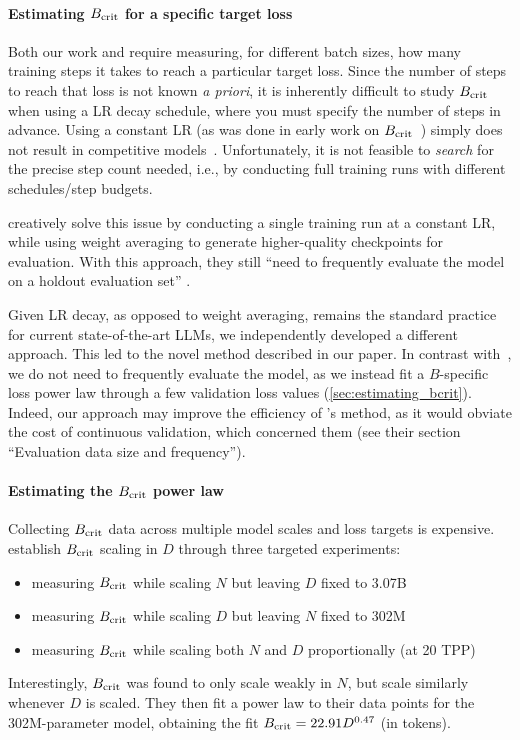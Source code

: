 \paragraph{Estimating $B_{\text{crit}}$ for a specific target loss}

Both our work and \citet{zhang2024how} require measuring, for
different batch sizes, how many training steps it takes to reach a
particular target loss.
%
Since the number of steps to reach that loss is not known \emph{a
priori}, it is inherently difficult to study $B_{\text{crit}}$ when using a LR
decay schedule, where you must specify the number of steps in advance.
Using a constant LR (as was done in early work on
$B_{\text{crit}}$~\citep{mccandlish2018empirical}) simply does not result in
competitive models~\citep{bergsma2025straight}.
%
Unfortunately, it is not feasible to \emph{search} for the precise
step count needed, i.e., by conducting full training runs with
different schedules/step budgets.

\citet{zhang2024how} creatively solve this issue by conducting a
single training run at a constant LR, while using weight averaging to
generate higher-quality checkpoints for evaluation.  With this
approach, they still ``need to frequently evaluate the model on a
holdout evaluation set'' \citep{zhang2024how}.

Given LR decay, as opposed to weight averaging, remains the standard
practice for current state-of-the-art LLMs, we independently developed
a different approach.  This led to the novel method described in our
paper.  In contrast with~\citet{zhang2024how}, we do not need to
frequently evaluate the model, as we instead fit a $B$-specific loss
power law through a few validation loss values
(\cref{sec:estimating_bcrit}).  Indeed, our approach may improve the
efficiency of \citet{zhang2024how}'s method, as it would obviate the
cost of continuous validation, which concerned them (see their section
``Evaluation data size and frequency'').

\paragraph{Estimating the $B_{\text{crit}}$ power law}

Collecting $B_{\text{crit}}$ data across multiple model scales and loss targets
is expensive.  \citet{zhang2024how} establish $B_{\text{crit}}$ scaling in $D$
through three targeted experiments:
\begin{itemize}
\item measuring $B_{\text{crit}}$ while scaling $N$ but leaving $D$ fixed to 3.07B
\item measuring $B_{\text{crit}}$ while scaling $D$ but leaving $N$ fixed to 302M
\item measuring $B_{\text{crit}}$ while scaling both $N$ and $D$ proportionally (at 20 TPP)
\end{itemize}
Interestingly, $B_{\text{crit}}$ was found to only scale weakly in $N$, but
scale similarly whenever $D$ is scaled.  They then fit a power law to
their data points for the 302M-parameter model, obtaining the fit
\mbox{$B_{\text{crit}} = 22.91 D^{0.47}$} (in tokens).

